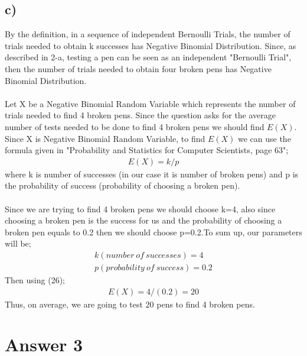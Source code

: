 \documentclass[12pt]{article}
\begin{document}
\subsection*{c)}  By the definition, in a sequence of independent Bernoulli Trials, the number of trials needed to obtain k successes has Negative Binomial Distribution. Since, as described in 2-a, testing a pen can be seen as an independent "Bernoulli Trial", then the number of trials needed to obtain four  broken pens has Negative Binomial Distribution. \\ \\
Let X be a Negative Binomial Random Variable which represents the number of trials needed to find 4 broken pens. Since the question asks for the average number of tests needed to be done to find 4 broken pens we should find $E(X)$. \\
Since X is Negative Binomial Random Variable, to find $E(X)$ we can use the formula given in "Probability and Statistics for Computer Scientists, page 63"; 
\begin{equation} 
\begin{split}
E(X) = k/p
\end{split}
\end{equation}
where k is number of successes (in our case it is number of broken pens) and p is the probability of success (probability of choosing a broken pen). \\ \\
Since we are trying to find 4 broken pens we should choose k=4, also since choosing a broken pen is the success for us and the probability of choosing a broken pen equals to 0.2 then we should choose p=0.2.To sum up, our parameters will be;
\begin{equation*} 
\begin{split}
k (number\ of\ successes) = 4 \\
p (probability\ of\ success) = 0.2
\end{split}
\end{equation*}
Then using (26);
\begin{equation*} 
\begin{split}
E(X) = 4/(0.2) = 20
\end{split}
\end{equation*}
Thus, on average, we are going to test 20 pens to find 4 broken pens.

\section*{Answer 3}
\end{document}
